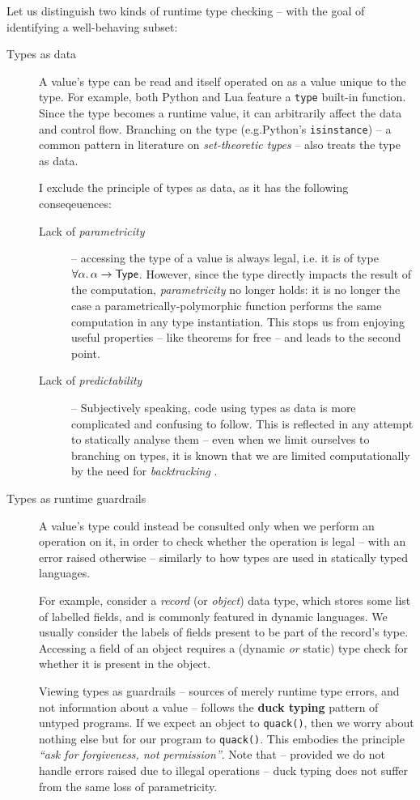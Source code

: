 Let us distinguish two kinds of runtime type checking -- with the goal of identifying a well-behaving subset: \begin{description}
    \item[Types as data] A value's type can be read and itself operated on as a value unique to the type. For example, both Python and Lua feature a \texttt{type} built-in function. Since the type becomes a runtime value, it can arbitrarily affect the data and control flow. 
    Branching on the type (e.g.\@ Python's \texttt{isinstance}) -- a common pattern in literature on \emph{set-theoretic types} -- also treats the type as data. 
    
    I exclude the principle of types as data, as it has the following conseqeuences: \begin{description}
        \item[Lack of \emph{parametricity}] -- accessing the type of a value is always legal, i.e. it is of type $\forall \alpha \ldotp \alpha \to \textsf{Type}$. However, since the type directly impacts the result of the computation, \emph{parametricity} no longer holds: it is no longer the case a parametrically-polymorphic function performs the same computation in any type instantiation. This stops us from enjoying useful properties -- like theorems for free \cite{theorems-for-free} -- and leads to the second point.
        \item[Lack of \emph{predictability}] -- Subjectively speaking, code using types as data is more complicated and confusing to follow. This is reflected in any attempt to statically analyse them -- even when we limit ourselves to branching on types, it is known that we are limited computationally by the need for \emph{backtracking} \cite{polymorphic-set-theoretic-types}.
    \end{description}
    \item[Types as runtime guardrails] A value's type could instead be consulted only when we perform an operation on it, in order to check whether the operation is legal -- with an error raised otherwise -- similarly to how types are used in statically typed languages.     
    
    For example, consider a \emph{record} (or \emph{object}) data type, which stores some list of labelled fields, and is commonly featured in dynamic languages. 
    We usually consider the labels of fields present to be part of the record's type.
    Accessing a field of an object requires a (dynamic \emph{or} static) type check for whether it is present in the object.
    
    Viewing types as guardrails -- sources of merely runtime type errors, and not information about a value -- follows the \textbf{duck typing} pattern \cite{duck-typing} of untyped programs. If we expect an object to \texttt{quack()}, then we worry about nothing else but for our program to \texttt{quack()}. This embodies the principle \textit{\enquote{ask for forgiveness, not permission}}.
    Note that -- provided we do not handle errors raised due to illegal operations -- duck typing does not suffer from the same loss of parametricity.
\end{description}
